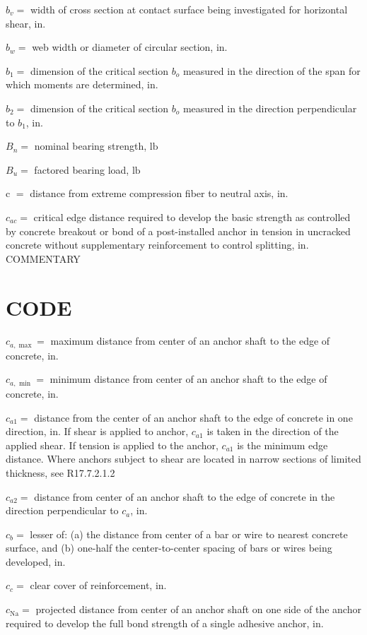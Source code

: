 \documentclass[10pt]{article}
\begin{document}
$b_{v}=$ width of cross section at contact surface being investigated for horizontal shear, in.

$b_{w}=$ web width or diameter of circular section, in.

$b_{1}=$ dimension of the critical section $b_{o}$ measured in the direction of the span for which moments are determined, in.

$b_{2}=$ dimension of the critical section $b_{o}$ measured in the direction perpendicular to $b_{1}$, in.

$B_{n}=$ nominal bearing strength, $\mathrm{lb}$

$B_{u}=$ factored bearing load, $\mathrm{lb}$

c $=$ distance from extreme compression fiber to neutral axis, in.

$c_{a c}=$ critical edge distance required to develop the basic strength as controlled by concrete breakout or bond of a post-installed anchor in tension in uncracked concrete without supplementary reinforcement to control splitting, in.\\
COMMENTARY

\section*{CODE}
$c_{a, \max }=$ maximum distance from center of an anchor shaft to the edge of concrete, in.

$c_{a, \text { min }}=$ minimum distance from center of an anchor shaft to the edge of concrete, in.

$c_{a 1}=$ distance from the center of an anchor shaft to the edge of concrete in one direction, in. If shear is applied to anchor, $c_{a 1}$ is taken in the direction of the applied shear. If tension is applied to the anchor, $c_{a 1}$ is the minimum edge distance. Where anchors subject to shear are located in narrow sections of limited thickness, see R17.7.2.1.2

$c_{a 2}=$ distance from center of an anchor shaft to the edge of concrete in the direction perpendicular to $c_{a}$, in.

$c_{b}=$ lesser of: (a) the distance from center of a bar or wire to nearest concrete surface, and (b) one-half the center-to-center spacing of bars or wires being developed, in.

$c_{c}=$ clear cover of reinforcement, in.

$c_{\mathrm{Na}}=$ projected distance from center of an anchor shaft on one side of the anchor required to develop the full bond strength of a single adhesive anchor, in.
\end{document}
